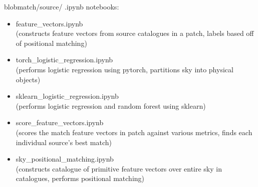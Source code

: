 \documentclass[12pt,a4paper]{article}
\begin{document}
blobmatch/source/ .ipynb notebooks:
\begin{itemize}
    \item feature\_vectors.ipynb\\
(constructs feature vectors from source catalogues in a patch, labels based off of positional matching)

    \item torch\_logistic\_regression.ipynb\\
(performs logistic regression using pytorch, partitions sky into physical objects)

    \item sklearn\_logistic\_regression.ipynb\\
(performs logistic regression and random forest using sklearn)

    \item score\_feature\_vectors.ipynb\\
(scores the match feature vectors in patch against various metrics, finds each individual source's best match)

    \item sky\_positional\_matching.ipynb\\
(constructs catalogue of primitive feature vectors over entire sky in catalogues, performs positional matching)
\end{itemize}
\end{document}

